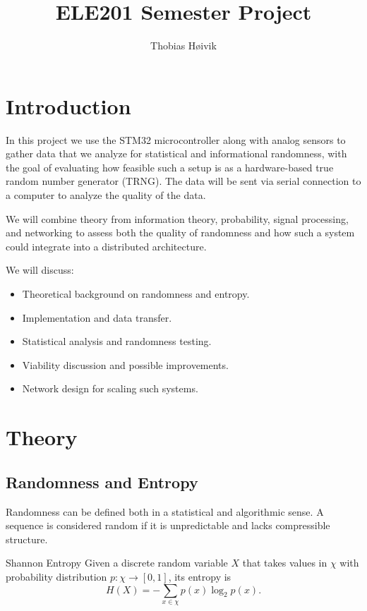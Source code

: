 
\usepackage{graphicx}

\title{\huge{ELE201 Semester Project}}
\author{\LARGE{Thobias Høivik}}
\date{}


\maketitle

\newpage
\tableofcontents

\newpage
\section{Introduction}
In this project we use the STM32 microcontroller along with analog 
sensors 
to gather data that we analyze for statistical and informational 
randomness, 
with the goal of evaluating how feasible such a setup is as a 
hardware-based true random number generator (TRNG). 
The data will be sent via serial connection to a computer 
to analyze the quality of the data.

We will combine theory from information theory, probability, 
signal processing, and networking to assess both the quality of 
randomness 
and how such a system could integrate into a distributed architecture.

We will discuss:
\begin{itemize}
    \item Theoretical background on randomness and entropy.
    \item Implementation and data transfer.
    \item Statistical analysis and randomness testing.
    \item Viability discussion and possible improvements.
    \item Network design for scaling such systems.
\end{itemize}

\newpage
\section{Theory}
\subsection{Randomness and Entropy}
Randomness can be defined both in a statistical and algorithmic sense. 
A sequence is considered random if it is unpredictable and lacks 
compressible structure.

\begin{defn}{Shannon Entropy}{}
Given a discrete random variable $X$ that takes values in $\chi$ with 
probability distribution $p:\chi \to [0,1]$, its entropy is
$$
    H(X) = - \sum_{x \in \chi} p(x) \log_2 p(x).
$$
\end{defn}

